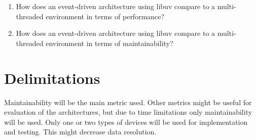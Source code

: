 \begin{enumerate}
    \item How does an event-driven architecture using libuv compare to a
        multi-threaded environment in terms of performance?

    \item How does an event-driven architecture using libuv compare to a
        multi-threaded environment in terms of maintainability?
\end{enumerate}

\section{Delimitations}
\label{sec:delimitations}

Maintainability will be the main metric used. Other metrics might be useful for
evaluation of the architectures, but due to time limitations only
maintainability will be used. Only one or two types of devices will be used for
implementation and testing. This might decrease data resolution.
